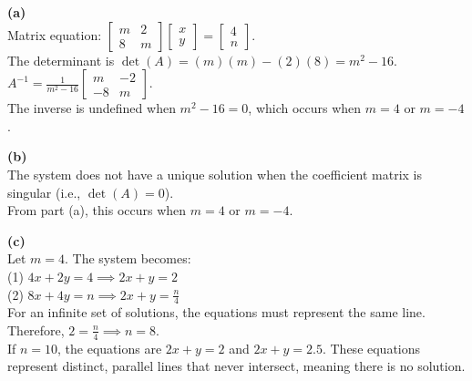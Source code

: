 \begin{solution}
\textbf{(a)} \\
Matrix equation: $\begin{bmatrix} m & 2 \\ 8 & m \end{bmatrix} \begin{bmatrix} x \\ y \end{bmatrix} = \begin{bmatrix} 4 \\ n \end{bmatrix}$. \\
The determinant is $\det(A) = (m)(m) - (2)(8) = m^2 - 16$. \\
$A^{-1} = \frac{1}{m^2 - 16} \begin{bmatrix} m & -2 \\ -8 & m \end{bmatrix}$. \\
The inverse is undefined when $m^2 - 16 = 0$, which occurs when $m = 4$ or $m = -4$.

\medskip
\textbf{(b)} \\
The system does not have a unique solution when the coefficient matrix is singular (i.e., $\det(A) = 0$). \\
From part (a), this occurs when $m = 4$ or $m = -4$.

\medskip
\textbf{(c)} \\
Let $m = 4$. The system becomes: \\
(1) $4x + 2y = 4 \implies 2x + y = 2$ \\
(2) $8x + 4y = n \implies 2x + y = \frac{n}{4}$ \\
For an infinite set of solutions, the equations must represent the same line. Therefore, $2 = \frac{n}{4} \implies n = 8$. \\
If $n = 10$, the equations are $2x + y = 2$ and $2x + y = 2.5$. These equations represent distinct, parallel lines that never intersect, meaning there is no solution.


\end{solution}
